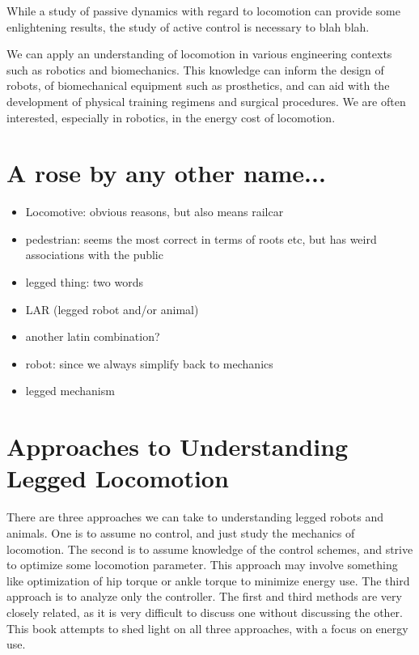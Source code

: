 While a study of passive dynamics with regard to locomotion can provide some enlightening results, the study of active control is necessary to blah blah.

We can apply an understanding of locomotion in various engineering contexts such as robotics and biomechanics. This knowledge can inform the design of robots, of biomechanical equipment such as prosthetics, and can aid with the development of physical training regimens and surgical procedures. We are often interested, especially in robotics, in the energy cost of locomotion.

\section{A rose by any other name...}

\begin{itemize}
\item Locomotive: obvious reasons, but also means railcar
\item pedestrian: seems the most correct in terms of roots etc, but has weird associations with the public
\item legged thing: two words
\item LAR (legged robot and/or animal)
\item another latin combination?
\item robot: since we always simplify back to mechanics
\item legged mechanism
\end{itemize}

\section{Approaches to Understanding Legged Locomotion} %
\label{sec:ApproachesToUnderstandingLeggedLocomotion}

There are three approaches we can take to understanding legged robots and animals. One is to assume no control, and just study the mechanics of locomotion. The second is to assume knowledge of the control schemes, and strive to optimize some locomotion parameter. This approach may involve something like optimization of hip torque or ankle torque to minimize energy use. The third approach is to analyze only the controller. The first and third methods are very closely related, as it is very difficult to discuss one without discussing the other. This book attempts to shed light on all three approaches, with a focus on energy use. 

